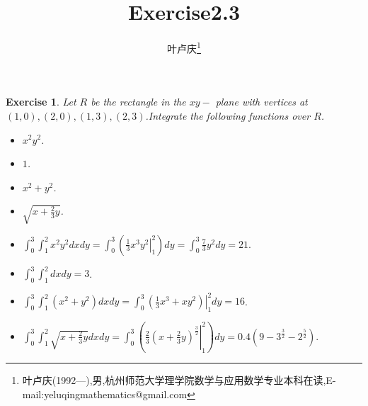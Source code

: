 \documentclass[a4paper]{article}
\newtheorem*{exe}{Exercise}
\newenvironment{exercise}
{\bigskip\begin{mdframed}\begin{exe}}
    {\end{exe}\end{mdframed}\bigskip}
\begin{document}
\title{\huge{\bf{Exercise2.3}}} \author{\small{叶卢庆\footnote{叶卢庆(1992---),男,杭州师范大学理学院数学与应用数学专业本科在读,E-mail:yeluqingmathematics@gmail.com}}}
\maketitle
\begin{exercise}
Let $R$ be the rectangle in the $xy-$ plane with vertices at
$(1,0),(2,0),(1,3),(2,3)$.Integrate the following functions over $R$.
\begin{itemize}
\item $x^2y^2$.
\item $1$.
\item $x^2+y^2$.
\item $\sqrt{x+\frac{2}{3}y}$.
\end{itemize}
\end{exercise}
\begin{itemize}
\item $\int_0^3\int_1^2x^2y^2dxdy=\int_0^3
  (\left.\frac{1}{3}x^3y^2\right|_{1}^2)dy=\int_0^3
  \frac{7}{3}y^2dy=21$.
\item $\int_0^3\int_1^2dxdy=3$.
\item $\int_0^3\int_1^2(x^2+y^2)dxdy=\int_0^3\left.(
    \frac{1}{3}x^3+xy^2)\right|_1^2dy=16 $.
\item $\int_0^3\int_1^2 \sqrt{x+\frac{2}{3}y}dxdy=\int_0^3 (\left.\frac{2}{3}(x+\frac{2}{3}y)^{\frac{3}{2}}\right|_1^2)dy=0.4(9-3^{\frac{3}{2}}-2^{\frac{5}{2}})$.
\end{itemize}
\end{document}
